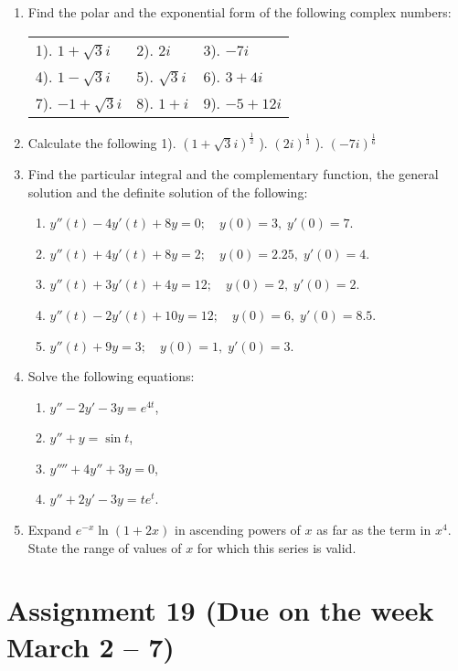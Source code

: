 \documentclass[12pt]{article} %
\theoremstyle{definition} %
\begin{document}
\begin{enumerate}
\item Find the polar and the exponential form of the following complex numbers:

\begin{tabular}{lll}
1). $1+\sqrt{3}i$ & 2). $2i$ & 3). $-7i$\\
4). $1-\sqrt{3}i$ & 5). $\sqrt{3}i$ & 6). $3+4i$\\
7). $-1+\sqrt{3}i$ & 8). $1+i$ & 9). $-5+12i$
\end{tabular}

\item Calculate the following
1). $(1+\sqrt{3}i)^{\frac12}$ ). $(2i)^{\frac13}$ ). $(-7i)^{\frac16}$

\item Find the particular integral and the complementary function, the general solution and the definite solution of the following:
\begin{enumerate}
\item $y''(t)-4y'(t)+8y=0;\quad y(0)=3,\; y'(0)=7$.
\item $y''(t)+4y'(t)+8y=2;\quad y(0)=2.25,\; y'(0)=4$.
\item $y''(t)+3y'(t)+4y=12;\quad y(0)=2,\; y'(0)=2$.
\item $y''(t)-2y'(t)+10y=12;\quad y(0)=6,\; y'(0)=8.5$.
\item $y''(t)+9y=3;\quad y(0)=1,\; y'(0)=3$.
\end{enumerate}


\item Solve the following equations:
\begin{enumerate}
\item $y''-2y'-3y=e^{4t}$,
\item $y''+y=\sin t$,
\item $y''''+4y''+3y=0$,
\item $y''+2y'-3y=te^t$.
\end{enumerate}
\item Expand $e^{-x}\ln(1+2x)$ in ascending powers of $x$ as far as the term in $x^4$. State the range of values of $x$ for which this series is valid.
\end{enumerate}




\section*{Assignment 19 (Due on the week March 2 – 7)}
\end{document}
